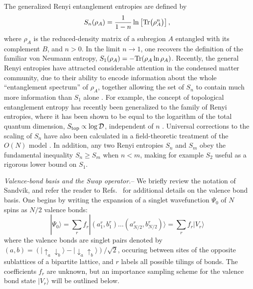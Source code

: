 \documentclass[prl,aps,twocolumn,floatfix,amsmath,amssymb,superscriptaddress,tightenlines]{revtex4}
\begin{document}
The generalized Renyi entanglement entropies are defined by
\begin{equation}
S_{n} (\rho_A) = \frac{1}{1- n} \ln \left[{ {\rm Tr}\big( \rho_A^{n} \big) }\right],
\label{Sn}
\end{equation}
where $\rho_A$ is the reduced-density matrix of a subregion $A$ entangled with its complement $B$, and 
$n>0$.  In the limit $n \rightarrow 1$, one recovers the 
definition of the familiar von Neumann entropy, $S_1 (\rho_A) = - {\rm Tr}( \rho_A \ln \rho_A )$.  
Recently, the general Renyi entropies have attracted considerable attention in the condensed matter community, due to their ability to encode
information about the whole ``entanglement spectrum'' of $\rho_A$, together allowing the set of $S_{n}$ to contain 
much more information than $S_1$ alone \cite{Espec}.  For example, the concept of topological entanglement entropy has recently been
generalized to the family of Renyi entropies, where it has been shown to be equal to the logarithm of the total quantum 
dimension, $S_{\rm top} \propto \log {\mathcal D}$, independent of $n$ \cite{PI}.  Universal corrections to the scaling of $S_{n}$ 
have also been calculated in a field-theoretic treatment of the $O(N)$ model \cite{Max}.
In addition, any two Renyi entropies $S_{n}$ and $S_{m}$ obey the fundamental
inequality $S_{n} \geq S_{m}$ when $n < m$, making for example $S_2$ useful as a rigorous
lower bound on $S_1$.  


{\it Valence-bond basis and the Swap operator.}-- We briefly review the notation of Sandvik, and refer the reader to 
Refs.~\cite{Sandvik,Beach,AWSloop} for additional details on the valence bond basis.
One begins by writing the expansion of a singlet
wavefunction $\Psi_0$ of $N$ spins as $N/2$ valence bonds:
\begin{equation}
| \Psi_0 \rangle = \sum_r f_r|(a^r_1,b^r_1) \ldots (a^r_{N/2},b^r_{N/2}) \rangle = \sum_r f_r| V_r \rangle
\end{equation}
where the valence bonds are singlet pairs denoted by $(a,b) = (\lvert\uparrow_a \downarrow_b \rangle - \lvert\downarrow_a \uparrow_b\rangle)/\sqrt{2}$,
occuring between sites of the opposite sublattices of a bipartite lattice, and $r$ labels all possible tilings of bonds.  The coefficients $f_r$ are unknown, but an importance sampling scheme \cite{Sandvik} for the valence bond state $| V_r \rangle$ will be outlined below.  
\end{document}
